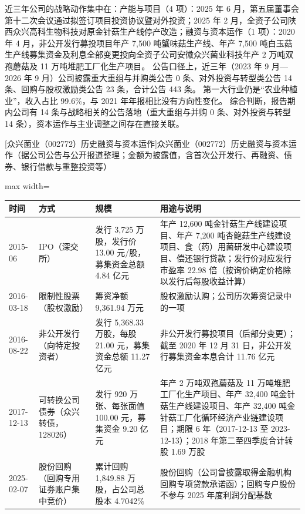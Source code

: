  近三年公司的战略动作集中在：产能与项目（4 项）：2025 年 6 月，第五届董事会第十二次会议通过拟签订项目投资协议暨对外投资；2025 年 2 月，全资子公司陕西众兴高科生物科技对原金针菇生产线停产改造；融资与资本运作（1 项）：2020 年 4 月，非公开发行募投项目年产 7,500 吨蟹味菇生产线、年产 7,500 吨白玉菇生产线募集资金及利息全部变更投向全资子公司安徽众兴菌业科技年产 2 万吨双孢蘑菇及 11 万吨堆肥工厂化生产项目。 公告口径上，近三年（2023 年 9 月---2026 年 9 月）公司披露重大重组与并购类公告 0 条、对外投资与转型类公告 14 条、回购与股权激励类公告 23 条，合计公告 443 条。 第一大行业仍是“农业种植业”，收入占比 99.6\%，与 2021 年年报相比没有方向性变化。 综合判断，报告期内公司有 14 条与战略相关的公告落地（重大重组与并购 0 条、对外投资与转型 14 条），资本运作与主业调整之间存在直接关联。

\begin{center}\small\setlength{\tabcolsep}{4pt}
[众兴菌业（002772）历史融资与资本运作]{众兴菌业（002772）历史融资与资本运作（据公司公告与公开报道整理；金额为披露值，含首次公开发行、再融资、债券、银行借款与重整投资等）}
\begin{adjustbox}{max width=\textwidth}
\begin{tabular}{@{}p{1.45cm}p{2.55cm}p{4.05cm}p{4.95cm}@{}}
\toprule
时间 & 方式 & 规模 & 用途与说明 \\
\midrule
2015-06 & IPO（深交所） & 发行 3,\allowbreak{}725 万股，\allowbreak{}发行价 13.00 元/\allowbreak{}股，\allowbreak{}募集资金总额 4.84 亿元 & 年产 12,\allowbreak{}600 吨金针菇生产线建设项目、\allowbreak{}年产 7,\allowbreak{}200 吨杏鲍菇生产线建设项目、\allowbreak{}食（药）用菌研发中心建设项目、\allowbreak{}偿还银行贷款；发行价对应发行市盈率 22.98 倍（按询价确定价格除以发行后每股收益计算） \\
2016-03-18 & 限制性股票（股权激励） & 筹资净额 9,\allowbreak{}361.94 万元 & 股权激励认购；公司历次筹资记录中的一项 \\
2016-08-22 & 非公开发行（向特定投资者） & 发行 5,\allowbreak{}368.33 万股，\allowbreak{}每股 21.00 元，\allowbreak{}募集资金总额 11.27 亿元 & 非公开发行募投项目（后部分变更）；截至 2020 年 12 月 31 日，\allowbreak{}非公开发行募集资金本息合计 11.76 亿元 \\
2017-12-13 & 可转换公司债券（众兴转债，128026） & 发行 920 万张、\allowbreak{}每张面值 100.00 元，\allowbreak{}募集资金 9.20 亿元 & 年产 2 万吨双孢蘑菇及 11 万吨堆肥工厂化生产项目、\allowbreak{}年产 32,\allowbreak{}400 吨金针菇生产线建设项目、\allowbreak{}年产 32,\allowbreak{}400 吨金针菇工厂化循环经济产业链建设项目；期限 6 年（2017-12-13 至 2023-12-13）；2018 年第二至四季度合计转股 1.69 万股 \\
2025-02-07 & 股份回购（回购专用证券账户集中竞价） & 累计回购 1,\allowbreak{}849.88 万股，\allowbreak{}占公司总股本 4.7042\% & 股份回购（公司曾披露取得金融机构回购专项贷款承诺函）；回购专户股份不参与 2025 年度利润分配基数 \\
\bottomrule
\end{tabular}
\end{adjustbox}
\end{center}

